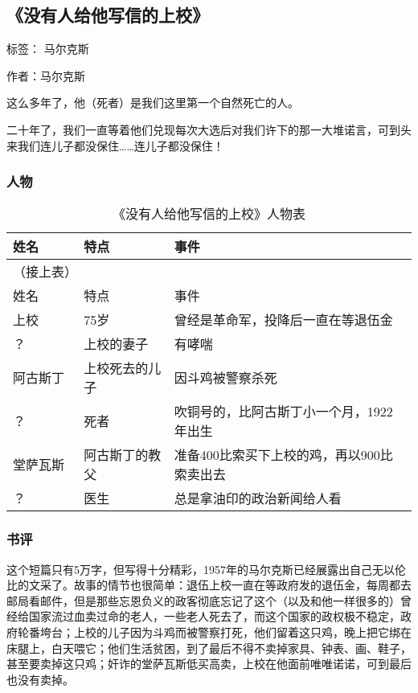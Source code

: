 \subsection{《没有人给他写信的上校》}

标签： 马尔克斯

作者：马尔克斯

这么多年了，他（死者）是我们这里第一个自然死亡的人。

二十年了，我们一直等着他们兑现每次大选后对我们许下的那一大堆诺言，可到头来我们连儿子都没保住……连儿子都没保住！

\subsubsection{人物}

\begin{longtable}{p{} | p{} | p{}}

    \caption{《没有人给他写信的上校》人物表} \\
    \hline
姓名 & 特点 & 事件 \\
\hline
\endfirsthead

（接上表） \\
姓名 & 特点 & 事件 \\
\hline
\endhead

\hline
\endfoot

上校 &75岁 & 曾经是革命军，投降后一直在等退伍金 \\
 ？ & 上校的妻子 & 有哮喘 \\
 阿古斯丁 & 上校死去的儿子 & 因斗鸡被警察杀死 \\
 ？ & 死者 & 吹铜号的，比阿古斯丁小一个月，1922年出生 \\
堂萨瓦斯 & 阿古斯丁的教父 & 准备400比索买下上校的鸡，再以900比索卖出去 \\
？ & 医生 & 总是拿油印的政治新闻给人看 \\
\end{longtable}

\subsubsection{书评}
这个短篇只有5万字，但写得十分精彩，1957年的马尔克斯已经展露出自己无以伦比的文采了。故事的情节也很简单：退伍上校一直在等政府发的退伍金，每周都去邮局看邮件，但是那些忘恩负义的政客彻底忘记了这个（以及和他一样很多的）曾经给国家流过血卖过命的老人，一些老人死去了，而这个国家的政权极不稳定，政府轮番垮台；上校的儿子因为斗鸡而被警察打死，他们留着这只鸡，晚上把它绑在床腿上，白天喂它；他们生活贫困，到了最后不得不卖掉家具、钟表、画、鞋子，甚至要卖掉这只鸡；奸诈的堂萨瓦斯低买高卖，上校在他面前唯唯诺诺，可到最后也没有卖掉。

